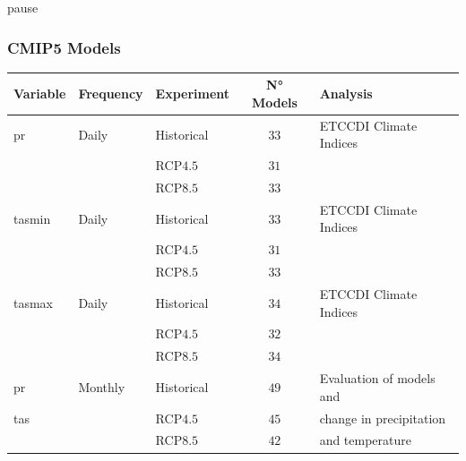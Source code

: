 \documentclass[14pt,usenames,dvipsnames]{beamer}
\begin{document}
\begin{frame}{pause}
      \frametitle{CMIP5 Models}
{\fontsize{10pt}{14}\selectfont

\centering
\begin{tabular}{lllcl}

\textbf{Variable}     &\textbf{Frequency}       &\textbf{Experiment}     & \textbf{N° Models}  & \textbf{Analysis}         \\ \hline
                                                                                                                           
pr                    & Daily                   & Historical             & $33$                  & ETCCDI Climate Indices    \\
                      &                         & RCP$4.5$               & $31$                  &                           \\
                      &                         & RCP$8.5$               & $33$                  &                           \pause \\
\hline                                                                                                                     
tasmin                & Daily                   & Historical             & $33$                  & ETCCDI Climate Indices    \\
                      &                         & RCP$4.5$               & $31$                  &                           \\
                      &                         & RCP$8.5$               & $33$                  &                           \\
\hline                                                                                                                     
tasmax                & Daily                   & Historical             & $34$                  & ETCCDI Climate Indices    \\
                      &                         & RCP$4.5$               & $32$                  &                           \\
                      &                         & RCP$8.5$               & $34$                  &                           \pause \\
                                                                                                                           
\hline                                                                                                                     
pr                    & Monthly                 & Historical             & $49$                  & Evaluation of models and  \\   
tas                   &                         & RCP$4.5$               & $45$                  & change in precipitation   \\
                      &                         & RCP$8.5$               & $42$                  & and temperature           \\

\end{tabular}
}
\end{frame}
\end{document}
